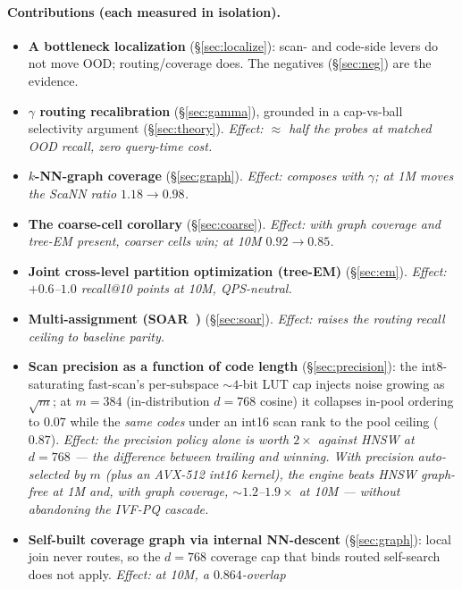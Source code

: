 \documentclass{article}
\begin{document}
\paragraph{Contributions (each measured in isolation).}
\begin{itemize}
  \item \textbf{A bottleneck localization} (\S\ref{sec:localize}): scan- and
    code-side levers do not move OOD; routing/coverage does. The negatives
    (\S\ref{sec:neg}) are the evidence.
  \item \textbf{$\gamma$ routing recalibration} (\S\ref{sec:gamma}), grounded in a
    cap-vs-ball selectivity argument (\S\ref{sec:theory}). \emph{Effect: $\approx$
    half the probes at matched OOD recall, zero query-time cost.}
  \item \textbf{$k$-NN-graph coverage} (\S\ref{sec:graph}). \emph{Effect: composes
    with $\gamma$; at 1M moves the ScaNN ratio $1.18\to0.98$.}
  \item \textbf{The coarse-cell corollary} (\S\ref{sec:coarse}). \emph{Effect: with
    graph coverage and tree-EM present, coarser cells win; at 10M $0.92\to0.85$.}
  \item \textbf{Joint cross-level partition optimization (tree-EM)}
    (\S\ref{sec:em}). \emph{Effect: $+0.6$--$1.0$ recall@10 points at 10M, QPS-neutral.}
  \item \textbf{Multi-assignment (SOAR~\cite{soar})} (\S\ref{sec:soar}). \emph{Effect: raises the
    routing recall ceiling to baseline parity.}
  \item \textbf{Scan precision as a function of code length}
    (\S\ref{sec:precision}): the int8-saturating fast-scan's per-subspace
    ${\sim}4$-bit LUT cap injects noise growing as $\sqrt{m}$; at $m{=}384$
    (in-distribution $d{=}768$ cosine) it collapses in-pool ordering to $0.07$
    while the \emph{same codes} under an int16 scan rank to the pool ceiling
    ($0.87$). \emph{Effect: the precision policy alone is worth $2\times$ against HNSW
    at $d{=}768$ --- the difference between trailing and winning. With precision
    auto-selected by $m$ (plus an AVX-512 int16 kernel), the engine beats HNSW
    graph-free at 1M and, with graph coverage, ${\sim}1.2$--$1.9\times$ at 10M ---
    without abandoning the IVF-PQ cascade.}
  \item \textbf{Self-built coverage graph via internal NN-descent}
    (\S\ref{sec:graph}): local join never routes, so the $d{=}768$ coverage cap
    that binds routed self-search does not apply. \emph{Effect: at 10M, a $0.864$-overlap
}
\end{itemize}
\end{document}

